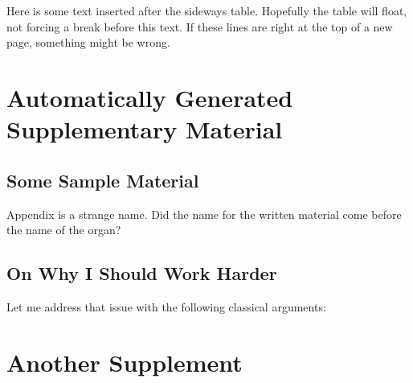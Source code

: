 \documentclass[draft]{csuthesis} %
\begin{document}
Here is some text inserted after the sideways table.  Hopefully the table will float, not forcing a break before this text.  If these lines are right at the top of a new page, something might be wrong. \lipsum[1-3]

\backmatter

\appendix

% 
\chapter{Automatically Generated Supplementary Material} %

\section{Some Sample Material}

Appendix is a strange name.  Did the name for the written material come before the name of the organ?

\lipsum[5-7]

\section{On Why I Should Work Harder}

Let me address that issue with the following classical arguments: \lipsum[1-2]

\chapter{Another Supplement}

\lipsum[1-3]
\end{document}

